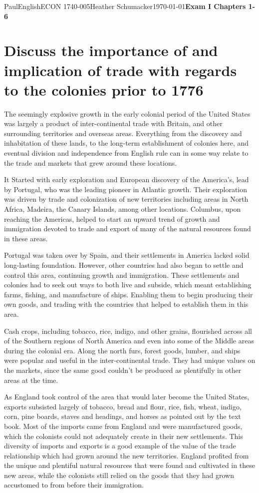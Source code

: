 \documentclass[12pt,letterpaper]{article}
\begin{document}
\begin{mla}{Paul}{English}{ECON 1740-005}{Heather
    Schumacker}{\today}{\textbf{Exam I Chapters 1-6}}

\singlespacing
\section{Discuss the importance of and implication of trade with
  regards to the colonies prior to 1776}
\doublespacing

The seemingly explosive growth in the early colonial period of the
United States was largely a product of inter-continental trade with
Britain, and other surrounding territories and overseas areas.
Everything from the discovery and inhabitation of these lands, to the
long-term establishment of colonies here, and eventual division and
independence from English rule can in some way relate to the trade and
markets that grew around these locations.

It Started with early exploration and European discovery of the
America's, lead by Portugal, who was the leading pioneer in Atlantic
growth. Their exploration was driven by trade and colonization of new
territories including areas in North Africa, Madeira, the Canary
Islands, among other locations. Columbus, upon reaching the Americas,
helped to start an upward trend of growth and immigration devoted to
trade and export of many of the natural resources found in these
areas.

Portugal was taken over by Spain, and their settlements in America
lacked solid long-lasting foundation. However, other countries had
also began to settle and control this area, continuing growth and
immigration. These settlements and colonies had to seek out ways to
both live and subside, which meant establishing farms, fishing, and
manufacture of ships. Enabling them to begin producing their own
goods, and trading with the countries that helped to establish them in
this area.

Cash crops, including tobacco, rice, indigo, and other grains,
flourished across all of the Southern regions of North America and
even into some of the Middle areas during the colonial era. Along the
north furs, forest goods, lumber, and ships were popular and useful in
the inter-continental trade. They had unique values on the markets,
since the same good couldn't be produced as plentifully in other areas
at the time.

As England took control of the area that would later become the United
States, exports subsisted largely of tobacco, bread and flour, rice,
fish, wheat, indigo, corn, pine boards, staves and headings, and horses
as pointed out by the text book. Most of the imports came from England
and were manufactured goods, which the colonists could not adequately
create in their new settlements. This diversity of imports and exports
is a good example of the value of the trade relationship which had
grown around the new territories. England profited from the unique and
plentiful natural resources that were found and cultivated in these
new areas, while the colonists still relied on the goods that they had
grown accustomed to from before their immigration. 


\end{mla}
\end{document}
